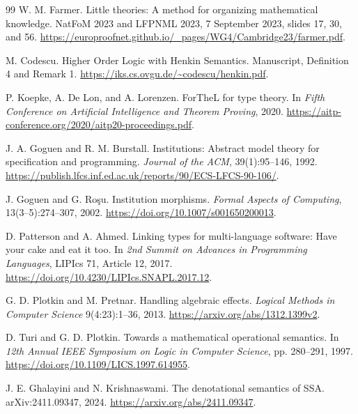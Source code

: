 \documentclass[11pt]{article}
\theoremstyle{definition}
\theoremstyle{remark}
\begin{document}
\begin{thebibliography}{99}
W. M. Farmer.
\newblock Little theories: A method for organizing mathematical knowledge.
\newblock NatFoM 2023 and LFPNML 2023, 7 September 2023, slides 17, 30, and 56.
\newblock \url{https://europroofnet.github.io/_pages/WG4/Cambridge23/farmer.pdf}.

M. Codescu.
\newblock Higher Order Logic with Henkin Semantics.
\newblock Manuscript, Definition 4 and Remark 1.
\newblock \url{https://iks.cs.ovgu.de/~codescu/henkin.pdf}.

P. Koepke, A. De Lon, and A. Lorenzen.
\newblock ForTheL for type theory.
\newblock In \emph{Fifth Conference on Artificial Intelligence and Theorem
  Proving}, 2020.
\newblock \url{https://aitp-conference.org/2020/aitp20-proceedings.pdf}.

J. A. Goguen and R. M. Burstall.
\newblock Institutions: Abstract model theory for specification and
  programming.
\newblock \emph{Journal of the ACM}, 39(1):95--146, 1992.
\newblock \url{https://publish.lfcs.inf.ed.ac.uk/reports/90/ECS-LFCS-90-106/}.

J. Goguen and G. Ro\c{s}u.
\newblock Institution morphisms.
\newblock \emph{Formal Aspects of Computing}, 13(3--5):274--307, 2002.
\newblock \url{https://doi.org/10.1007/s001650200013}.

D. Patterson and A. Ahmed.
\newblock Linking types for multi-language software: Have your cake and eat it
  too.
\newblock In \emph{2nd Summit on Advances in Programming Languages}, LIPIcs
  71, Article 12, 2017.
\newblock \url{https://doi.org/10.4230/LIPIcs.SNAPL.2017.12}.

G. D. Plotkin and M. Pretnar.
\newblock Handling algebraic effects.
\newblock \emph{Logical Methods in Computer Science} 9(4:23):1--36, 2013.
\newblock \url{https://arxiv.org/abs/1312.1399v2}.

D. Turi and G. D. Plotkin.
\newblock Towards a mathematical operational semantics.
\newblock In \emph{12th Annual IEEE Symposium on Logic in Computer Science},
  pp. 280--291, 1997.
\newblock \url{https://doi.org/10.1109/LICS.1997.614955}.

J. E. Ghalayini and N. Krishnaswami.
\newblock The denotational semantics of SSA.
\newblock arXiv:2411.09347, 2024.
\newblock \url{https://arxiv.org/abs/2411.09347}.


\end{thebibliography}
\end{document}
